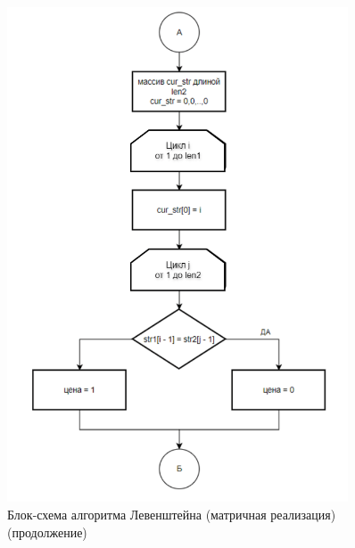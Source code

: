 \begin{figure}[H]
    \centering
    \includegraphics[width=0.9\textwidth]{img/block_1_1_2.png}
    \caption{Блок-схема алгоритма Левенштейна (матричная реализация) (продолжение)}
    \label{fig:block_1_1_2}
\end{figure}

